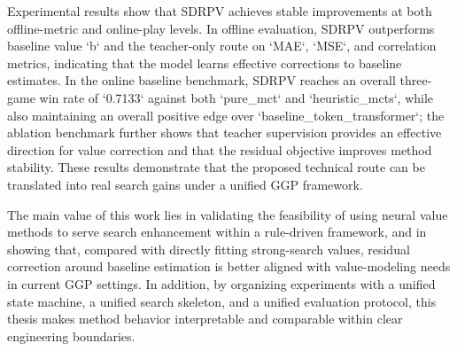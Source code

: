 
Experimental results show that SDRPV achieves stable improvements at both offline-metric and online-play levels. In offline evaluation, SDRPV outperforms baseline value `b` and the teacher-only route on `MAE`, `MSE`, and correlation metrics, indicating that the model learns effective corrections to baseline estimates. In the online baseline benchmark, SDRPV reaches an overall three-game win rate of `0.7133` against both `pure_mct` and `heuristic_mcts`, while also maintaining an overall positive edge over `baseline_token_transformer`; the ablation benchmark further shows that teacher supervision provides an effective direction for value correction and that the residual objective improves method stability. These results demonstrate that the proposed technical route can be translated into real search gains under a unified GGP framework.


The main value of this work lies in validating the feasibility of using neural value methods to serve search enhancement within a rule-driven framework, and in showing that, compared with directly fitting strong-search values, residual correction around baseline estimation is better aligned with value-modeling needs in current GGP settings. In addition, by organizing experiments with a unified state machine, a unified search skeleton, and a unified evaluation protocol, this thesis makes method behavior interpretable and comparable within clear engineering boundaries.


